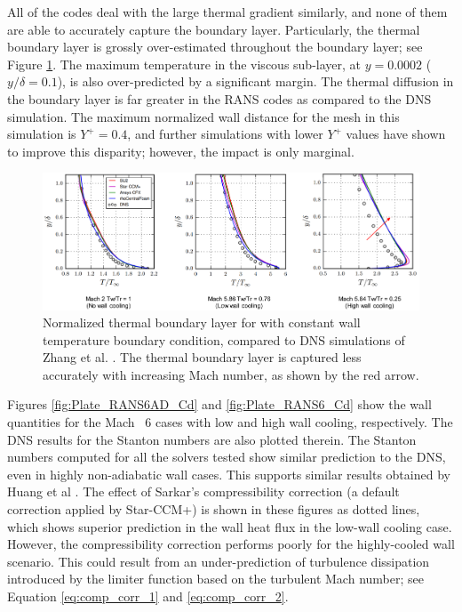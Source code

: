 \documentclass[journal ]{new-aiaa}
\begin{document}
All of the codes deal with the large thermal gradient similarly, and none of them are able to accurately capture the boundary layer. Particularly, the thermal boundary layer is grossly over-estimated throughout the boundary layer; see Figure \ref{fig:ThermalBL}. The maximum temperature in the viscous sub-layer, at $y = 0.0002$ ($y/\delta = 0.1$), is also over-predicted by a significant margin. The thermal diffusion in the boundary layer is far greater in the RANS codes as compared to the DNS simulation. The maximum normalized wall distance for the mesh in this simulation is $Y^+ = 0.4$,  and further simulations with lower $Y^+$ values have shown to improve this disparity; however, the impact is only marginal. 


\begin{figure}
\centering
    \includegraphics[width=\textwidth]{CHT/Thermal_Boundary_Layer.png}
  \caption{Normalized thermal boundary layer for with constant wall temperature boundary condition, compared to DNS simulations of Zhang et al. \cite{Zhang2018DNS}. The thermal boundary layer is captured less accurately with increasing Mach number, as shown by the red arrow.}
  \label{fig:ThermalBL}
\end{figure}

Figures \ref{fig:Plate_RANS6AD_Cd} and \ref{fig:Plate_RANS6_Cd} show the wall quantities for the Mach ~6 cases with low and high wall cooling, respectively. The DNS results for the Stanton numbers are also plotted therein. The Stanton numbers computed for all the solvers tested show similar prediction to the DNS, even in highly non-adiabatic wall cases. This supports similar results obtained by Huang et al \cite{Huang2019}. The effect of Sarkar's compressibility correction (a default correction applied by Star-CCM+) is shown in these figures as dotted lines, which shows superior prediction in the wall heat flux in the low-wall cooling case. However, the compressibility correction performs poorly for the highly-cooled wall scenario. This could result from an under-prediction of turbulence dissipation introduced by the limiter function based on the turbulent Mach number; see Equation \eqref{eq:comp_corr_1} and \eqref{eq:comp_corr_2}.
\end{document}
